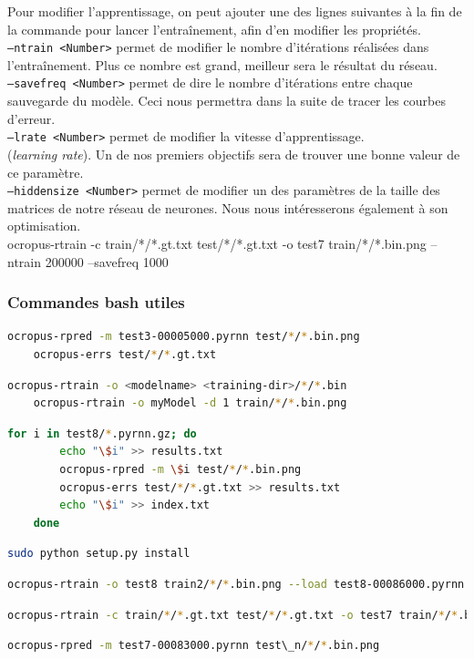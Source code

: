 \documentclass{article}
\begin{document}
Pour modifier l'apprentissage, on peut ajouter une des lignes suivantes à la fin de la commande pour lancer l'entraînement, afin d'en modifier les propriétés. \\
\noindent \texttt{--ntrain <Number>} permet de modifier le nombre d'itérations réalisées dans l'entraînement. Plus ce nombre est grand, meilleur sera le résultat du réseau. \\
\texttt{--savefreq <Number>} permet de dire le nombre d'itérations entre chaque sauvegarde du modèle. Ceci nous permettra dans la suite de tracer les courbes d'erreur. \\
\texttt{--lrate <Number>} permet de modifier la vitesse d'apprentissage. \\ (\textit{learning rate}). Un de nos premiers objectifs sera de trouver une bonne valeur de ce paramètre. \\
\texttt{--hiddensize <Number>} permet de modifier un des paramètres de la taille des matrices de notre réseau de neurones. Nous nous intéresserons également à son optimisation. \\

ocropus-rtrain -c train/*/*.gt.txt test/*/*.gt.txt -o test7 train/*/*.bin.png --ntrain 200000 --savefreq 1000

\subsubsection{Commandes bash utiles}

\begin{lstlisting}[language=bash]
    ocropus-rpred -m test3-00005000.pyrnn test/*/*.bin.png
    ocropus-errs test/*/*.gt.txt
\end{lstlisting}

\begin{lstlisting}[language=bash]
    ocropus-rtrain -o <modelname> <training-dir>/*/*.bin
    ocropus-rtrain -o myModel -d 1 train/*/*.bin.png
\end{lstlisting}

\begin{lstlisting}[language=bash]
    for i in test8/*.pyrnn.gz; do
        echo "\$i" >> results.txt
        ocropus-rpred -m \$i test/*/*.bin.png
        ocropus-errs test/*/*.gt.txt >> results.txt
        echo "\$i" >> index.txt
    done
\end{lstlisting}

\begin{lstlisting}[language=bash]
    sudo python setup.py install
\end{lstlisting}

\begin{lstlisting}[language=bash]
    ocropus-rtrain -o test8 train2/*/*.bin.png --load test8-00086000.pyrnn
\end{lstlisting}

\begin{lstlisting}[language=bash]
    ocropus-rtrain -c train/*/*.gt.txt test/*/*.gt.txt -o test7 train/*/*.bin.png --load test7-00073000.pyrnn
\end{lstlisting}

\begin{lstlisting}[language=bash]
    ocropus-rpred -m test7-00083000.pyrnn test\_n/*/*.bin.png
\end{lstlisting}
\end{document}
